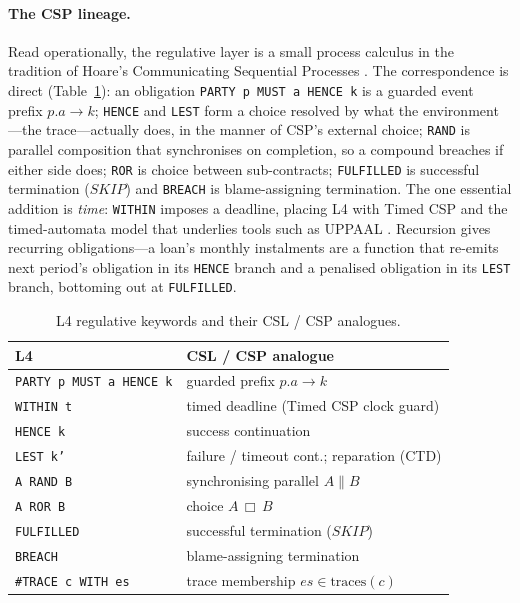 \documentclass[sigconf,nonacm]{acmart}
\newcommand{\code}[1]{\texttt{\small #1}}
\begin{document}
\paragraph{The CSP lineage.}
Read operationally, the regulative layer is a small process calculus in the
tradition of Hoare's Communicating Sequential Processes
\cite{hoare1978csp,hoare1985csp,roscoe1997theory}. The correspondence is
direct (Table~\ref{tab:csp}): an obligation \code{PARTY p MUST a HENCE k} is
a guarded event prefix $p.a \rightarrow k$; \code{HENCE} and \code{LEST}
form a choice resolved by what the environment---the trace---actually does,
in the manner of CSP's external choice; \code{RAND} is parallel composition
that synchronises on completion, so a compound breaches if either side does;
\code{ROR} is choice between sub-contracts; \code{FULFILLED} is successful
termination ($\mathit{SKIP}$) and \code{BREACH} is blame-assigning
termination. The one essential addition is \emph{time}: \code{WITHIN}
imposes a deadline, placing L4 with Timed CSP \cite{reed1988timedcsp} and the
timed-automata model that underlies tools such as UPPAAL
\cite{alur1994timed,behrmann2004uppaal}. Recursion gives recurring
obligations---a loan's monthly instalments are a function that re-emits next
period's obligation in its \code{HENCE} branch and a penalised obligation in
its \code{LEST} branch, bottoming out at \code{FULFILLED}.

\begin{table}[t]
\caption{L4 regulative keywords and their CSL / CSP analogues.}
\label{tab:csp}
\small
\begin{tabular}{@{}ll@{}}
\toprule
\textbf{L4} & \textbf{CSL / CSP analogue} \\
\midrule
\code{PARTY p MUST a HENCE k} & guarded prefix $p.a \rightarrow k$ \\
\code{WITHIN t}               & timed deadline (Timed CSP clock guard) \\
\code{HENCE k}                & success continuation \\
\code{LEST k'}                & failure / timeout cont.; reparation (CTD) \\
\code{A RAND B}               & synchronising parallel $A \parallel B$ \\
\code{A ROR B}                & choice $A \,\Box\, B$ \\
\code{FULFILLED}              & successful termination ($\mathit{SKIP}$) \\
\code{BREACH}                 & blame-assigning termination \\
\code{\#TRACE c WITH es}      & trace membership $es \in \mathrm{traces}(c)$ \\
\bottomrule
\end{tabular}
\end{table}
\end{document}
